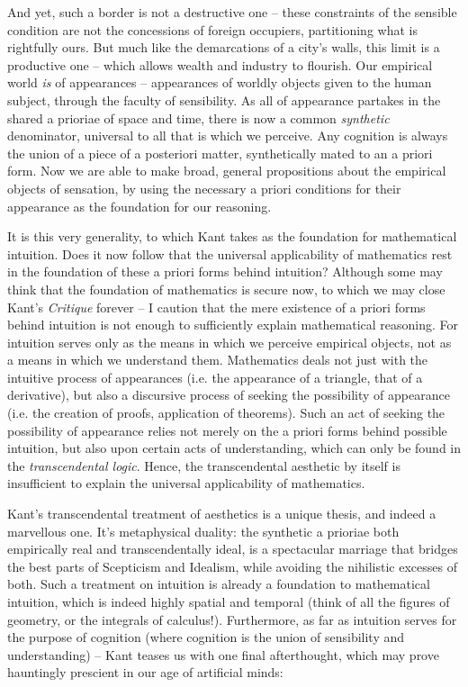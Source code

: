 \noindent
And yet, such a border is not a destructive one -- these constraints of the sensible condition are not the concessions of foreign occupiers, partitioning what is rightfully ours. But much like the demarcations of a city's walls, this limit is a productive one -- which allows wealth and industry to flourish. Our empirical world \emph{is} of appearances -- appearances of worldly objects given to the human subject, through the faculty of sensibility. As all of appearance partakes in the shared a prioriae of space and time, there is now a common \emph{synthetic} denominator, universal to all that is which we perceive. Any cognition is always the union of a piece of a posteriori matter, synthetically mated to an a priori form. Now we are able to make broad, general propositions about the empirical objects of sensation, by using the necessary a priori conditions for their appearance as the foundation for our reasoning.

\noindent
It is this very generality, to which Kant takes as the foundation for mathematical intuition. Does it now follow that the universal applicability of mathematics rest in the foundation of these a priori forms behind intuition? Although some may think that the foundation of mathematics is secure now, to which we may close Kant's \emph{Critique} forever -- I caution that the mere existence of a priori forms behind intuition is not enough to sufficiently explain mathematical reasoning. For intuition serves only as the means in which we perceive empirical objects, not as a means in which we understand them. Mathematics deals not just with the intuitive process of appearances (i.e. the appearance of a triangle, that of a derivative), but also a discursive process of seeking the possibility of appearance (i.e. the creation of proofs, application of theorems). Such an act of seeking the possibility of appearance relies not merely on the a priori forms behind possible intuition, but also upon certain acts of understanding, which can only be found in the \emph{transcendental logic}. Hence, the transcendental aesthetic by itself is insufficient to explain the universal applicability of mathematics.

Kant's transcendental treatment of aesthetics is a unique thesis, and indeed a marvellous one. It's metaphysical duality: the synthetic a prioriae both empirically real and transcendentally ideal, is a spectacular marriage that bridges the best parts of Scepticism and Idealism, while avoiding the nihilistic excesses of both. Such a treatment on intuition is already a foundation to mathematical intuition, which is indeed highly spatial and temporal (think of all the figures of geometry, or the integrals of calculus!). Furthermore, as far as intuition serves for the purpose of cognition (where cognition is the union of sensibility and understanding) -- Kant teases us with one final afterthought, which may prove hauntingly prescient in our age of artificial minds:

